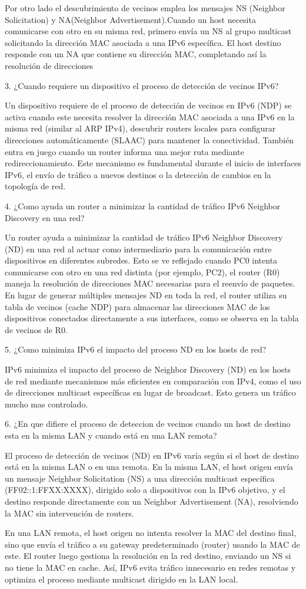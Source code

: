 \documentclass{article}
\begin{document}
Por otro lado el descubrimiento de vecinos emplea los mensajes NS (Neighbor Solicitation) y NA(Neighbor Advertisement).Cuando un host necesita comunicarse con otro en su misma red, primero envía un NS al grupo multicast solicitando la dirección MAC asociada a una IPv6 específica. El host destino responde con un NA que contiene su dirección MAC, completando así la resolución de direcciones

3. ¿Cuando requiere un dispositivo el proceso de detección de vecinos IPv6?

Un dispositivo requiere de el proceso de detección de vecinos en IPv6 (NDP) se activa cuando este necesita resolver la dirección MAC asociada a una IPv6 en la misma red (similar al ARP IPv4), descubrir routers locales para configurar direcciones automáticamente (SLAAC) para mantener la conectividad. También entra en juego cuando un router informa una mejor ruta mediante redireccionamiento. Este mecanismo es fundamental durante el inicio de interfaces IPv6, el envío de tráfico a nuevos destinos o la detección de cambios en la topología de red.

4. ¿Como ayuda un router a minimizar la cantidad de tráfico IPv6 Neighbor Discovery en una red?

Un router ayuda a minimizar la cantidad de tráfico IPv6 Neighbor Discovery (ND) en una red al actuar como intermediario para la comunicación entre dispositivos en diferentes subredes. Esto se ve reflejado cuando PC0 intenta comunicarse con otro en una red distinta (por ejemplo, PC2), el router (R0) maneja la resolución de direcciones MAC necesarias para el reenvío de paquetes. En lugar de generar múltiples mensajes ND en toda la red, el router utiliza su tabla de vecinos (cache NDP) para almacenar las direcciones MAC de los dispositivos conectados directamente a sus interfaces, como se observa en la tabla de vecinos de R0.

5. ¿Como minimiza IPv6 el impacto del proceso ND en los hosts de red?

IPv6 minimiza el impacto del proceso de Neighbor Discovery (ND) en los hosts de red mediante mecanismos más eficientes en comparación con IPv4, como el uso de direcciones multicast específicas en lugar de broadcast. Esto genera un tráfico mucho mas controlado.

6. ¿En que difiere el proceso de deteccion de vecinos cuando un host de destino esta en la misma LAN y cuando está en una LAN remota?

El proceso de detección de vecinos (ND) en IPv6 varía según si el host de destino está en la misma LAN o en una remota. En la misma LAN, el host origen envía un mensaje Neighbor Solicitation (NS) a una dirección multicast específica (FF02::1:FFXX:XXXX), dirigido solo a dispositivos con la IPv6 objetivo, y el destino responde directamente con un Neighbor Advertisement (NA), resolviendo la MAC sin intervención de routers.

En una LAN remota, el host origen no intenta resolver la MAC del destino final, sino que envía el tráfico a su gateway predeterminado (router) usando la MAC de este. El router luego gestiona la resolución en la red destino, enviando un NS si no tiene la MAC en cache. Así, IPv6 evita tráfico innecesario en redes remotas y optimiza el proceso mediante multicast dirigido en la LAN local.
\end{document}
